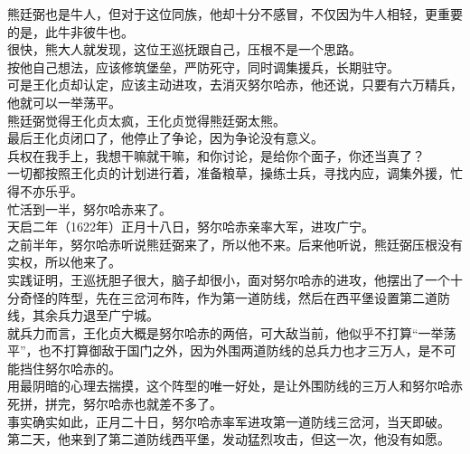 \begin{multicols}{\theparacolNo}
熊廷弼也是牛人，但对于这位同族，他却十分不感冒，不仅因为牛人相轻，更重要的是，此牛非彼牛也。\\

很快，熊大人就发现，这位王巡抚跟自己，压根不是一个思路。\\

按他自己想法，应该修筑堡垒，严防死守，同时调集援兵，长期驻守。\\

可是王化贞却认定，应该主动进攻，去消灭努尔哈赤，他还说，只要有六万精兵，他就可以一举荡平。\\

熊廷弼觉得王化贞太疯，王化贞觉得熊廷弼太熊。\\

最后王化贞闭口了，他停止了争论，因为争论没有意义。\\

兵权在我手上，我想干嘛就干嘛，和你讨论，是给你个面子，你还当真了？\\

一切都按照王化贞的计划进行着，准备粮草，操练士兵，寻找内应，调集外援，忙得不亦乐乎。\\

忙活到一半，努尔哈赤来了。\\

天启二年（1622年）正月十八日，努尔哈赤亲率大军，进攻广宁。\\

之前半年，努尔哈赤听说熊廷弼来了，所以他不来。后来他听说，熊廷弼压根没有实权，所以他来了。\\

实践证明，王巡抚胆子很大，脑子却很小，面对努尔哈赤的进攻，他摆出了一个十分奇怪的阵型，先在三岔河布阵，作为第一道防线，然后在西平堡设置第二道防线，其余兵力退至广宁城。\\

就兵力而言，王化贞大概是努尔哈赤的两倍，可大敌当前，他似乎不打算“一举荡平”，也不打算御敌于国门之外，因为外围两道防线的总兵力也才三万人，是不可能挡住努尔哈赤的。\\

用最阴暗的心理去揣摸，这个阵型的唯一好处，是让外围防线的三万人和努尔哈赤死拼，拼完，努尔哈赤也就差不多了。\\

事实确实如此，正月二十日，努尔哈赤率军进攻第一道防线三岔河，当天即破。\\

第二天，他来到了第二道防线西平堡，发动猛烈攻击，但这一次，他没有如愿。\\


\end{multicols}
